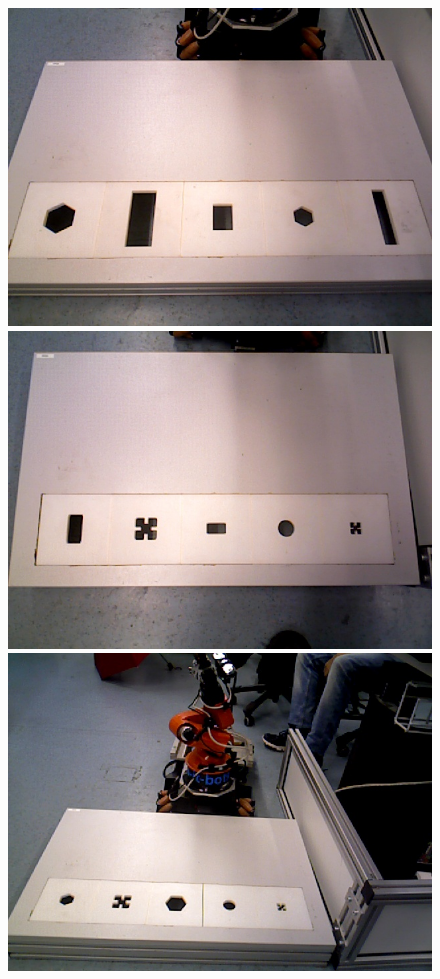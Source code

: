 \documentclass{article}
\begin{document}
\begin{figure}[h!]
\begin{minipage}{\textwidth}
\centering
\includegraphics[scale=0.15]{images/First_set.jpg}\hspace{0.1cm}
\includegraphics[scale=0.15]{images/Second_set.jpg}
\includegraphics[scale=0.15]{images/Third_set.jpg}

\end{minipage}
\end{figure}
\end{document}
